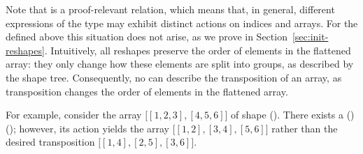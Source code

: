 \begin{code}[hide]
\AgdaSymbol{;}\AgdaSpace{}%
\AgdaSpace{}%
\AgdaSpace{}%
\<%
\\
%
\>[2]\AgdaSpace{}%
\AgdaSpace{}%
\AgdaSpace{}%
\<%
\\
%
\>[2]\AgdaSpace{}%
\AgdaSpace{}%
\<%
\\
\>[2][@{}l@{\AgdaIndent{0}}]%
\>[4]\AgdaSpace{}%
\AgdaSpace{}%
\AgdaSpace{}%
\<%
\\
%
\>[4]\AgdaSpace{}%
\AgdaSpace{}%
\AgdaSpace{}%
\<%
\\
%
\>[4]\AgdaSpace{}%
\AgdaSpace{}%
\AgdaSpace{}%
\<%
\\
%
\>[4]\AgdaSpace{}%
\AgdaSpace{}%
\AgdaSpace{}%
\AgdaSpace{}%
\AgdaSymbol{(}\AgdaSymbol{)}\<%
\\
%
\\[\AgdaEmptyExtraSkip]%
%
\>[2]\AgdaSpace{}%
\<%
\\
\>[2][@{}l@{\AgdaIndent{0}}]%
\>[4]\AgdaSpace{}%
\AgdaSymbol{:}\AgdaSpace{}%
\<%
\\
%
\>[4]\AgdaSpace{}%
\AgdaSpace{}%
\AgdaSymbol{:}\AgdaSpace{}%
\<%
\end{code}

Note that  is a proof-relevant relation, which means that, in
general, different expressions of the type \;\; may
exhibit distinct actions on indices and arrays.  For the  defined
above this situation does not arise, as we prove in
Section~\ref{sec:init-reshapes}.  Intuitively, all reshapes preserve the order
of elements in the flattened array: they only change how these elements are
split into groups, as described by the shape tree.  Consequently, no
 can describe the transposition of an array, as transposition
changes the order of elements in the flattened array.

For example, consider the array $\bigl[[1,2,3],[4,5,6]\bigr]$ of shape
(\;\;). There exists a
\;(\;\;)\;(\;\;);
however, its action yields the array $\bigl[[1,2],[3,4],[5,6]\bigr]$ rather
than the desired transposition $\bigl[[1,4],[2,5],[3,6]\bigr]$.


